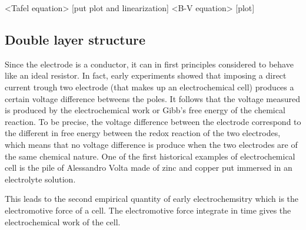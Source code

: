 <Tafel equation>
[put plot and linearization]
<B-V equation>
[plot]

\subsection{Double layer structure}

Since the electrode is a conductor, it can in first principles considered to behave like an ideal resistor. In fact, early experiments showed that imposing a direct current trough two electrode (that makes up an electrochemical cell) produces a certain voltage difference betweens the poles. It follows that the voltage measured is produced by the electrochemical work or Gibb's free energy of the chemical reaction. To be precise, the voltage difference between the electrode correspond to the different in free energy between the redox reaction of the two electrodes, which means that no voltage difference is produce when the two electrodes are of the same chemical nature. One of the first historical examples of electrochemical cell is the pile of Alessandro Volta made of zinc and copper put immersed in an electrolyte solution. 

This leads to the second empirical quantity of early electrochemsitry which is the electromotive force of a cell. The electromotive force integrate in time gives the electrochemical work of the cell.

